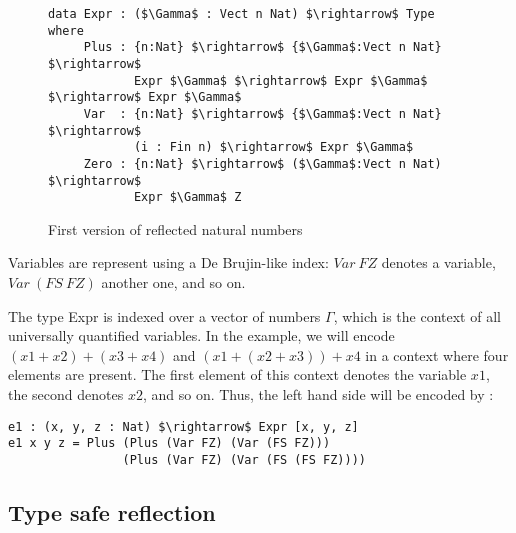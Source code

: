 \begin{figure}[H]
\figrule
\begin{center}
\begin{lstlisting}
data Expr : ($\Gamma$ : Vect n Nat) $\rightarrow$ Type where
     Plus : {n:Nat} $\rightarrow$ {$\Gamma$:Vect n Nat} $\rightarrow$ 
            Expr $\Gamma$ $\rightarrow$ Expr $\Gamma$ $\rightarrow$ Expr $\Gamma$
     Var  : {n:Nat} $\rightarrow$ {$\Gamma$:Vect n Nat} $\rightarrow$ 
            (i : Fin n) $\rightarrow$ Expr $\Gamma$
     Zero : {n:Nat} $\rightarrow$ ($\Gamma$:Vect n Nat) $\rightarrow$ 
            Expr $\Gamma$ Z
\end{lstlisting}
\end{center}
\caption{First version of reflected natural numbers}
\label{reflectedNaturalNumbers0}
\figrule
\end{figure}


Variables are represent using a De Brujin-like index: $Var\:FZ$ denotes a variable, $Var\:(FS\:FZ)$ another one, and so on.

The type Expr is indexed over a vector of numbers $\Gamma$, which is the context of all universally quantified variables. In the example, we will encode $(x1 + x2) + (x3 + x4)$ and $(x1 + (x2 + x3)) + x4$ in a context where four elements are present. The first element of this context denotes the variable $x1$, the second denotes $x2$, and so on.
Thus, the left hand side will be encoded by :

\begin{lstlisting}
e1 : (x, y, z : Nat) $\rightarrow$ Expr [x, y, z]
e1 x y z = Plus (Plus (Var FZ) (Var (FS FZ))) 
                (Plus (Var FZ) (Var (FS (FS FZ))))
\end{lstlisting}


\subsection{Type safe reflection}

